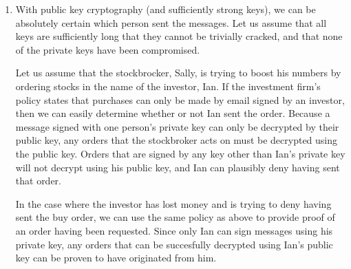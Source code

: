 \documentclass[11pt]{article}
\begin{document}
\begin{enumerate}
\item %

With public key cryptography (and sufficiently strong keys), we can be 
absolutely certain which person sent the messages.  Let us assume that all
keys are sufficiently long that they cannot be trivially cracked, and that
none of the private keys have been compromised. 

Let us assume that the stockbrocker, Sally, is trying to boost his numbers by
ordering stocks in the name of the investor, Ian.  If the investment firm's
policy states that purchases can only be made by email signed by an investor,
then we can easily determine whether or not Ian sent the order.  Because a
message signed with one person's private key can only be decrypted by their
public key, any orders that the stockbroker acts on must be decrypted using
the public key.  Orders that are signed by any key other than Ian's private
key will not decrypt using his public key, and Ian can plausibly deny having
sent that order. 

In the case where the investor has lost money and is trying to deny having
sent the buy order, we can use the same policy as above to provide proof of an
order having been requested.  Since only Ian can sign messages using his
private key, any orders that can be succesfully decrypted using Ian's public
key can be proven to have originated from him.

\end{enumerate}
\end{document}
